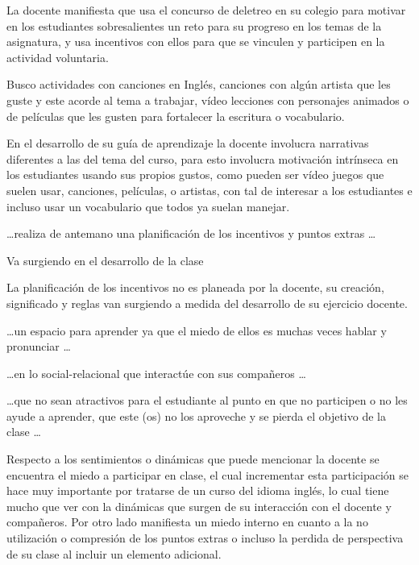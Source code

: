 La docente manifiesta que usa el concurso de deletreo en su colegio para motivar en los estudiantes 
sobresalientes un reto para su progreso en los temas de la asignatura, y usa incentivos con ellos para que se 
vinculen y participen en la actividad voluntaria.

\begin{displayquote}
	Busco actividades con canciones en Inglés, canciones con algún artista que les guste y este acorde al 
	tema a trabajar, vídeo lecciones con personajes animados o de películas que les gusten para fortalecer 
	la escritura o vocabulario.
\end{displayquote}

En el desarrollo de su guía de aprendizaje la docente involucra narrativas diferentes a las del tema del 
curso, para esto involucra motivación intrínseca en los estudiantes usando sus propios gustos, como pueden ser 
vídeo juegos que suelen usar, canciones, películas, o artistas, con tal de interesar a los estudiantes e 
incluso usar un vocabulario que todos ya suelan manejar.

\begin{displayquote}
	\dots realiza de antemano una planificación de los incentivos y puntos extras \dots

	Va surgiendo en el desarrollo de la clase
\end{displayquote}

La planificación de los incentivos no es planeada por la docente, su creación, significado y reglas van 
surgiendo a medida del desarrollo de su ejercicio docente.

\begin{displayquote}
	\dots un espacio para aprender ya que el miedo de ellos es muchas veces hablar y pronunciar \dots 

	\dots en lo social-relacional que interactúe con sus compañeros \dots

	\dots que no sean atractivos para el estudiante al punto en que no participen o no les ayude a 
	aprender, que este (os) no los aproveche y se pierda el objetivo de la clase \dots
\end{displayquote}

Respecto a los sentimientos o dinámicas que puede mencionar la docente se encuentra el miedo a participar en 
clase, el cual incrementar esta participación se hace muy importante por tratarse de un curso del idioma 
inglés, lo cual tiene mucho que ver con la dinámicas que surgen de su interacción con el docente y compañeros. 
Por otro lado manifiesta un miedo interno en cuanto a la no utilización o compresión de los puntos extras o
incluso la perdida de perspectiva de su clase al incluir un elemento adicional.

